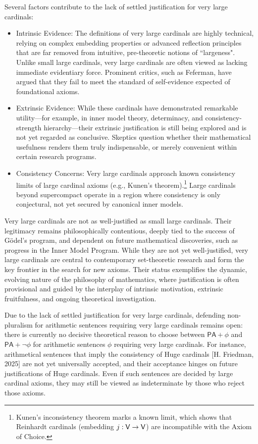 \documentclass[a4paper,12pt]{amsart}
\theoremstyle{definition}
\numberwithin{equation}{section}
\begin{document}
Several factors contribute to the lack of settled justification for very large cardinals:
\begin{itemize}
  \item Intrinsic Evidence:  The definitions of very large cardinals are highly technical, relying on complex embedding properties or advanced reflection principles that are far removed from intuitive, pre-theoretic notions of ``largeness". Unlike small large cardinals, very large cardinals are often viewed as lacking immediate evidentiary force. Prominent critics, such as Feferman, have argued that they fail to meet the standard of self-evidence expected of foundational axioms.
  \item Extrinsic Evidence: While these cardinals have demonstrated remarkable utility—for example, in inner model theory, determinacy, and consistency-strength hierarchy—their extrinsic justification is still being explored and is not yet regarded as conclusive. Skeptics question whether their mathematical usefulness renders them truly indispensable, or merely convenient within certain research programs.                  
  \item Consistency Concerns:  Very large cardinals approach known consistency limits of large cardinal axioms (e.g., Kunen's theorem).\footnote{Kunen's inconsistency theorem marks a known limit, which shows that Reinhardt cardinals (embedding $j: \sf V \rightarrow V$) are incompatible with the Axiom of Choice.} Large cardinals beyond supercompact operate in a region where consistency is only conjectural, not yet secured by canonical inner models.
\end{itemize}

Very large cardinals  are not as well-justified as small large cardinals. Their legitimacy remains philosophically contentious, deeply tied to the success of Gödel's program, and dependent on future mathematical discoveries, such as progress in the Inner Model Program.
While they are not yet  well-justified, very large cardinals are central to contemporary set-theoretic research and form the key frontier in the search for new axioms. Their status exemplifies the dynamic, evolving nature of the philosophy of mathematics, where justification is often provisional and guided by the interplay of intrinsic motivation, extrinsic fruitfulness, and ongoing theoretical investigation. 

Due to the lack of settled justification for very large cardinals, defending non-pluralism for arithmetic sentences requiring very large cardinals remains open: there is currently no decisive theoretical reason to choose between $\mathsf{PA} + \phi$ and $\mathsf{PA} + \neg \phi$ for arithmetic sentences $\phi$ requiring very large cardinals. For instance, arithmetical sentences that imply the consistency of Huge cardinals [H. Friedman, 2025] are not yet universally accepted, and their acceptance hinges on future justifications of Huge cardinals.
Even if such sentences are decided by large cardinal axioms, they may still be viewed as indeterminate by those who reject those axioms.
\end{document}
